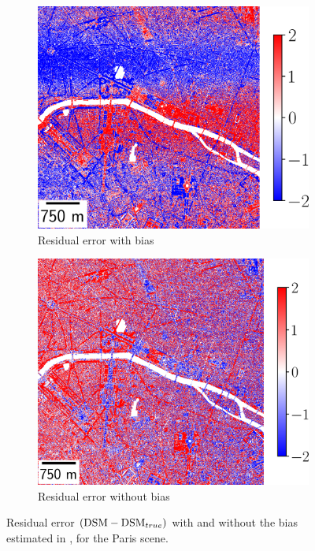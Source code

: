 \begin{figure}
    \begin{subfigure}[t]{0.48\linewidth}
        \flushleft
        \includegraphics[width=\linewidth]{Images/Chap_6/vibrations_Paris.png}
        \caption{Residual error with bias}
        \label{fig:vibrations_Paris_with_bias}
    \end{subfigure}\hfill
    \begin{subfigure}[t]{0.48\linewidth}
        \flushright
        \includegraphics[width=\linewidth]{Images/Chap_6/vibration_corrected_Paris.png}
        \caption{Residual error without bias}
        \label{fig:vibrations_Paris_without_bias}
    \end{subfigure}
    \caption{Residual error $(\mathrm{DSM}-\mathrm{DSM}_{true})$ with and without the bias estimated in , for the Paris scene.}
    \label{fig:removed_bias_Paris}
\end{figure}

